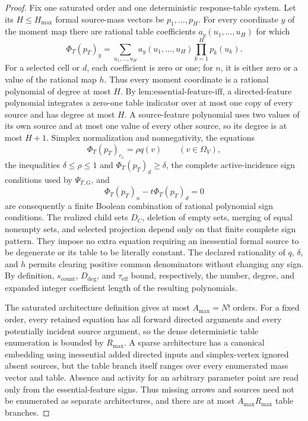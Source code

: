 \documentclass{article}
\begin{document}
\begin{proof}
Fix one saturated order and one deterministic response-table system.  Let its \(H\leq H_{\max}\) formal source-mass vectors be \(p_1,\ldots,p_H\).  For every coordinate \(y\) of the moment map there are rational table coefficients \(a_y(u_1,\ldots,u_H)\) for which
\[
\Phi_T(p_T)_y
=\sum_{u_1,\ldots,u_H}
  a_y(u_1,\ldots,u_H)\prod_{k=1}^H p_k(u_k).
\]
For a selected cell or \(d\), each coefficient is zero or one; for \(n\), it is either zero or a value of the rational map \(h\).  Thus every moment coordinate is a rational polynomial of degree at most \(H\).  By \(\text{lem:essential-feature-iff}\), a directed-feature polynomial integrates a zero-one table indicator over at most one copy of every source and has degree at most \(H\).  A source-feature polynomial uses two values of its own source and at most one value of every other source, so its degree is at most \(H+1\).  Simplex normalization and nonnegativity, the equations
\[
\Phi_T(p_T)_{c_v}=\rho q(v)\qquad(v\in\Omega_V),
\]
the inequalities \(\delta\leq\rho\leq1\) and \(\Phi_T(p_T)_d\geq\delta\), the complete active-incidence sign conditions used by \(\Psi_{T,G}\), and
\[
\Phi_T(p_T)_n-t\Phi_T(p_T)_d=0
\]
are consequently a finite Boolean combination of rational polynomial sign conditions.  The realized child sets \(D_C\), deletion of empty sets, merging of equal nonempty sets, and selected projection depend only on that finite complete sign pattern.  They impose no extra equation requiring an inessential formal source to be degenerate or its table to be literally constant.  The declared rationality of \(q\), \(\delta\), and \(h\) permits clearing positive common denominators without changing any sign.  By definition, \(s_{\mathrm{count}}\), \(D_{\mathrm{deg}}\), and \(\tau_{\mathrm{eff}}\) bound, respectively, the number, degree, and expanded integer coefficient length of the resulting polynomials.

The saturated architecture definition gives at most \(A_{\max}=N!\) orders.  For a fixed order, every retained equation has all forward directed arguments and every potentially incident source argument, so the dense deterministic table enumeration is bounded by \(R_{\max}\).  A sparse architecture has a canonical embedding using inessential added directed inputs and simplex-vertex ignored absent sources, but the table branch itself ranges over every enumerated mass vector and table.  Absence and activity for an arbitrary parameter point are read only from the essential-feature signs.  Thus missing arrows and sources need not be enumerated as separate architectures, and there are at most \(A_{\max}R_{\max}\) table branches.


\end{proof}
\end{document}
